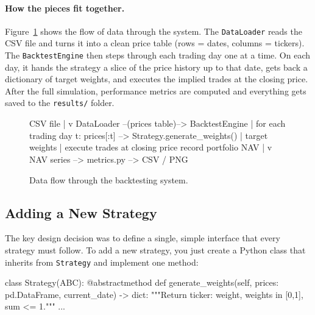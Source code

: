 \documentclass[11pt,a4paper]{article}
\begin{document}
\paragraph{How the pieces fit together.}
Figure~\ref{fig:arch} shows the flow of data through the system.
The \texttt{DataLoader} reads the CSV file and turns it into a clean price table
(rows = dates, columns = tickers).
The \texttt{BacktestEngine} then steps through each trading day one at a time.
On each day, it hands the strategy a slice of the price history up to that date,
gets back a dictionary of target weights, and executes the implied trades at the
closing price.
After the full simulation, performance metrics are computed and everything gets
saved to the \texttt{results/} folder.

\begin{figure}[H]
\centering
\begin{minipage}{0.82\textwidth}
\small
\begin{codeblock}
CSV file
   |
   v
DataLoader  --(prices table)-->  BacktestEngine
                                       |
                           for each trading day t:
                             prices[:t] --> Strategy.generate_weights()
                                       |
                                  target weights
                                       |
                              execute trades at closing price
                              record portfolio NAV
                                       |
                                       v
                              NAV series --> metrics.py --> CSV / PNG
\end{codeblock}
\end{minipage}
\caption{Data flow through the backtesting system.}
\label{fig:arch}
\end{figure}

\subsection{Adding a New Strategy}

The key design decision was to define a single, simple interface that every strategy
must follow.
To add a new strategy, you just create a Python class that inherits from
\texttt{Strategy} and implement one method:

\begin{codeblock}
class Strategy(ABC):
    @abstractmethod
    def generate_weights(self, prices: pd.DataFrame, current_date) -> dict:
        """Return {ticker: weight}, weights in [0,1], sum <= 1."""
        ...
\end{codeblock}
\end{document}
